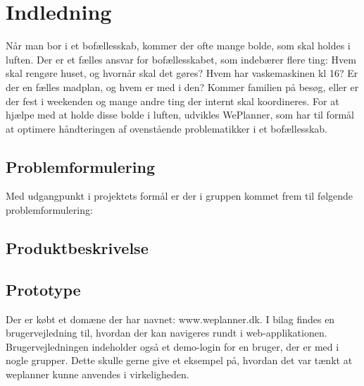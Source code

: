 \chapter{Indledning} \label{cph:indledning}

\noindent Når man bor i et bofællesskab, kommer der ofte mange bolde, som skal holdes i luften. Der er et fælles ansvar for bofællesskabet, som indebærer flere ting: Hvem skal rengøre huset, og hvornår skal det gøres? Hvem har vaskemaskinen kl 16? Er der en fælles madplan, og hvem er med i den? Kommer familien på besøg, eller er der fest i weekenden og mange andre ting der internt skal koordineres. For at hjælpe med at holde disse bolde i luften, udvikles WePlanner, som har til formål at optimere håndteringen af ovenstående problematikker i et bofællesskab.



\section{Problemformulering}\label{sec:problemformulering}
Med udgangpunkt i projektets formål er der i gruppen kommet frem til følgende problemformulering:


\section{Produktbeskrivelse}

\section{Prototype}
Der er købt et domæne der har navnet: www.weplanner.dk. I bilag findes en brugervejledning til, hvordan der kan navigeres rundt i web-applikationen.  Brugervejledningen indeholder også et demo-login for en bruger, der er med i nogle grupper. Dette skulle gerne give et eksempel på, hvordan det var tænkt at weplanner kunne anvendes i virkeligheden. 

